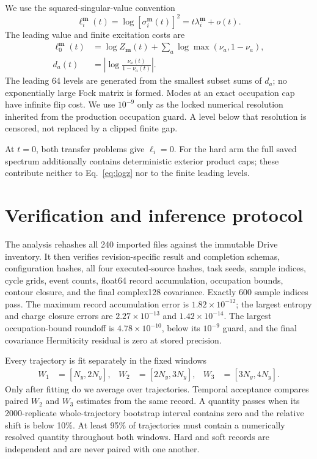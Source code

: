 \documentclass[aps,prb,twocolumn,floatfix,nofootinbib,superscriptaddress]{revtex4-2}
\begin{document}
We use the squared-singular-value convention
\begin{equation}
 \ell_i^{\bm m}(t)=\log[\sigma_i^{\bm m}(t)]^2
 =t\lambda_i^{\bm m}+o(t).
 \label{eq:convention}
\end{equation}
The leading value and finite excitation costs are
\begin{align}
 \ell_0^{\bm m}(t)
 &=\log Z_{\bm m}(t)+\sum_a\log\max(\nu_a,1-\nu_a),\\
 d_a(t)&=\left|\log\frac{\nu_a(t)}{1-\nu_a(t)}\right|.
\end{align}
The leading 64 levels are generated from the smallest subset sums of $d_a$;
no exponentially large Fock matrix is formed.  Modes at an exact occupation
cap have infinite flip cost.  We use $10^{-9}$ only as the locked numerical
resolution inherited from the production occupation guard.  A level below
that resolution is censored, not replaced by a clipped finite gap.

At $t=0$, both transfer problems give $\ell_i=0$.  For the hard arm the full
saved spectrum additionally contains deterministic exterior product caps;
these contribute neither to Eq.~\eqref{eq:logz} nor to the finite leading
levels.

\section{Verification and inference protocol}

The analysis rehashes all 240 imported files against the immutable Drive
inventory.  It then verifies revision-specific result and completion schemas,
configuration hashes, all four executed-source hashes, task seeds, sample
indices, cycle grids, event counts, float64 record accumulation, occupation
bounds, contour closure, and the final complex128 covariance.  Exactly 600
sample indices pass.  The maximum record accumulation error is
$1.82\times10^{-12}$; the largest entropy and charge closure errors are
$2.27\times10^{-13}$ and $1.42\times10^{-14}$.  The largest occupation-bound
roundoff is $4.78\times10^{-10}$, below its $10^{-9}$ guard, and the final
covariance Hermiticity residual is zero at stored precision.

Every trajectory is fit separately in the fixed windows
\begin{align}
 W_1&=[N_y,2N_y],&
 W_2&=[2N_y,3N_y],&
 W_3&=[3N_y,4N_y].
\end{align}
Only after fitting do we average over trajectories.  Temporal acceptance
compares paired $W_2$ and $W_3$ estimates from the same record.  A quantity
passes when its 2000-replicate whole-trajectory bootstrap interval contains
zero and the relative shift is below 10\%.  At least 95\% of trajectories
must contain a numerically resolved quantity throughout both windows.  Hard
and soft records are independent and are never paired with one another.
\end{document}
